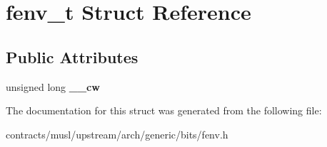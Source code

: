 \hypertarget{structfenv__t}{}\section{fenv\+\_\+t Struct Reference}
\label{structfenv__t}
\subsection*{Public Attributes}
\begin{DoxyCompactItemize}
\item 
\mbox{\label{structfenv__t_aecc6604b429c015596941f5eb8a2b776}} 
unsigned long {\bfseries \+\_\+\+\_\+cw}
\end{DoxyCompactItemize}


The documentation for this struct was generated from the following file\+:\begin{DoxyCompactItemize}
\item 
contracts/musl/upstream/arch/generic/bits/fenv.\+h\end{DoxyCompactItemize}
